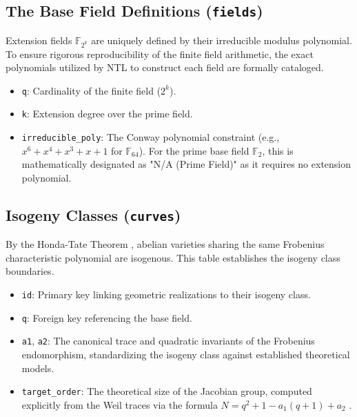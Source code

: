\documentclass[letterpaper, 11pt]{article}
\begin{document}
	\subsection{The Base Field Definitions (\texttt{fields})}
	Extension fields $\mathbb{F}_{2^k}$ are uniquely defined by their irreducible modulus polynomial. To ensure rigorous reproducibility of the finite field arithmetic, the exact polynomials utilized by NTL to construct each field are formally cataloged.
	\begin{itemize}
		\item \texttt{q}: Cardinality of the finite field ($2^k$).
		\item \texttt{k}: Extension degree over the prime field.
		\item \texttt{irreducible\_poly}: The Conway polynomial constraint (e.g., $x^6 + x^4 + x^3 + x + 1$ for $\mathbb{F}_{64}$). For the prime base field $\mathbb{F}_2$, this is mathematically designated as "N/A (Prime Field)" as it requires no extension polynomial.
	\end{itemize}
	
	\subsection{Isogeny Classes (\texttt{curves})}
	By the Honda-Tate Theorem \cite{Honda1968}, abelian varieties sharing the same Frobenius characteristic polynomial are isogenous. This table establishes the isogeny class boundaries.
	\begin{itemize}
		\item \texttt{id}: Primary key linking geometric realizations to their isogeny class.
		\item \texttt{q}: Foreign key referencing the base field.
		\item \texttt{a1}, \texttt{a2}: The canonical trace and quadratic invariants of the Frobenius endomorphism, standardizing the isogeny class against established theoretical models.
		\item \texttt{target\_order}: The theoretical size of the Jacobian group, computed explicitly from the Weil traces via the formula $N = q^2 + 1 - a_1(q + 1) + a_2$ \cite{Waterhouse1969}.
	\end{itemize}
	
\end{document}
